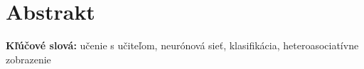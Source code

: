 \section*{Abstrakt}

\begin{flushleft}
  \textbf{Kľúčové slová:} učenie s učiteľom, neurónová sieť, klasifikácia, heteroasociatívne zobrazenie
\end{flushleft}



